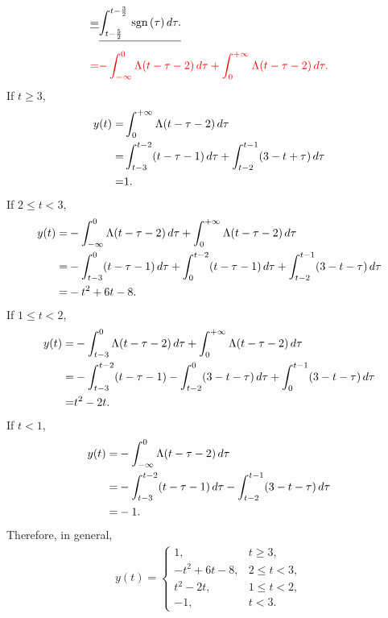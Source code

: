 \documentclass{assignment}
\begin{document}
\begin{sol}
\begin{itemize}
\begin{align}
            \sout{=}&\sout{\int_{t-\frac{5}{2}}^{t-\frac{3}{2}}\sgn(\tau)\,d\tau.}\\
            {\color{red}=}&{\color{red}-\int_{-\infty}^0\Lambda(t-\tau-2)\,d\tau+\int_0^{+\infty}\Lambda(t-\tau-2)\,d\tau.}
        \end{align}
        {\color{red}
            If $t\geq 3$,
            \begin{align}
                \notag y(t)=&\int_0^{+\infty}\Lambda(t-\tau-2)\,d\tau\\
                \notag=&\int_{t-3}^{t-2}(t-\tau-1)\,d\tau+\int_{t-2}^{t-1}(3-t+\tau)\,d\tau\\
                =&1.
            \end{align}
            If $2\leq t<3$,
            \begin{align}
                \notag y(t)=&-\int_{-\infty}^0\Lambda(t-\tau-2)\,d\tau+\int_0^{+\infty}\Lambda(t-\tau-2)\,d\tau\\
                \notag=&-\int_{t-3}^0(t-\tau-1)\,d\tau+\int_0^{t-2}(t-\tau-1)\,d\tau+\int_{t-2}^{t-1}(3-t-\tau)\,d\tau\\
                =&-t^2+6t-8.
            \end{align}
            If $1\leq t<2$,
            \begin{align}
                \notag y(t)=&-\int_{t-3}^0\Lambda(t-\tau-2)\,d\tau+\int_0^{+\infty}\Lambda(t-\tau-2)\,d\tau\\
                \notag=&-\int_{t-3}^{t-2}(t-\tau-1)-\int_{t-2}^0(3-t-\tau)\,d\tau+\int_0^{t-1}(3-t-\tau)\,d\tau\\
                =&t^2-2t.
            \end{align}
            If $t<1$,
            \begin{align}
                \notag y(t)=&-\int_{-\infty}^0\Lambda(t-\tau-2)\,d\tau\\
                \notag=&-\int_{t-3}^{t-2}(t-\tau-1)\,d\tau-\int_{t-2}^{t-1}(3-t-\tau)\,d\tau\\
                =&-1.
            \end{align}
            Therefore, in general,
            \begin{align}
                y(t)=\left\{\begin{array}{ll}
                    1,&t\geq 3,\\
                    -t^2+6t-8,&2\leq t<3,\\
                    t^2-2t,&1\leq t<2,\\
                    -1,&t<3.
                \end{array}\right.
            \end{align}
        }
    \end{itemize}
\end{sol}
\end{document}
